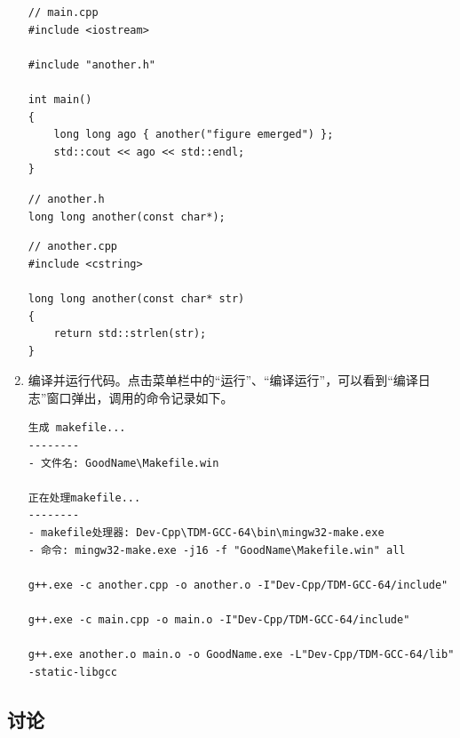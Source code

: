 \begin{enumerate}
	\begin{lstlisting}[language={[17]C++}, moreemph={[2]another}]
// main.cpp
#include <iostream>

#include "another.h"

int main()
{
	long long ago { another("figure emerged") };
	std::cout << ago << std::endl;
}
	\end{lstlisting}

	\begin{lstlisting}[language={[17]C++}, moreemph={[2]another}]
// another.h
long long another(const char*);
	\end{lstlisting}

	\begin{lstlisting}[language={[17]C++}, moreemph={[2]another, strlen}]
// another.cpp
#include <cstring>

long long another(const char* str)
{
	return std::strlen(str);
}
	\end{lstlisting}

	\item 编译并运行代码。点击菜单栏中的“运行”、“编译运行”，可以看到“编译日志”窗口弹出，调用的命令记录如下。

	\begin{lstlisting}[language={}]
生成 makefile...
--------
- 文件名: GoodName\Makefile.win

正在处理makefile...
--------
- makefile处理器: Dev-Cpp\TDM-GCC-64\bin\mingw32-make.exe
- 命令: mingw32-make.exe -j16 -f "GoodName\Makefile.win" all

g++.exe -c another.cpp -o another.o -I"Dev-Cpp/TDM-GCC-64/include"

g++.exe -c main.cpp -o main.o -I"Dev-Cpp/TDM-GCC-64/include"

g++.exe another.o main.o -o GoodName.exe -L"Dev-Cpp/TDM-GCC-64/lib" -static-libgcc
	\end{lstlisting}
\end{enumerate}

\subsection*{讨论}

